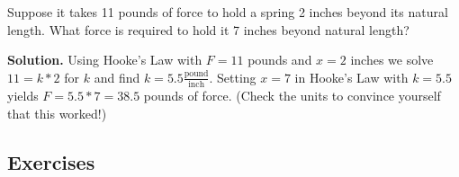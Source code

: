 \documentclass{ximera}
\begin{document}
\medskip

\begin{example} \label{findingkinvariation} Suppose it takes 11 pounds of force to hold a spring 2 inches beyond its natural length.  What force is required to hold it 7 inches beyond natural length?

\smallskip

{\bf Solution.}  Using Hooke's Law with $F = 11$ pounds and $x = 2$ inches we solve $11 = k*2$ for $k$ and find $k = 5.5 \frac{\text{pound}}{\text{inch}}$.  Setting $x = 7$ in Hooke's Law with $k = 5.5$ yields $F = 5.5*7 = 38.5$ pounds of force.  (Check the units to convince yourself that this worked!)

\end{example}

\newpage

\subsection{Exercises}


\closegraphsfile
\end{document}
